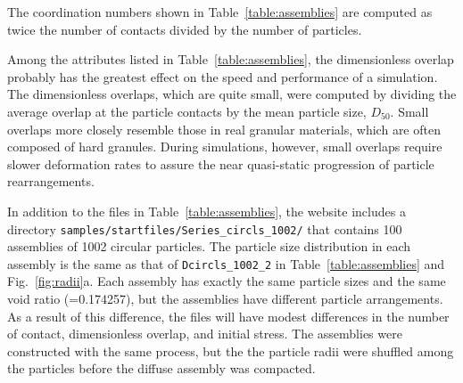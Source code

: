 \documentclass[letterpaper,11pt]{article}
\begin{document}
The coordination numbers shown in Table~\ref{table:assemblies}
are computed as
twice the number of contacts divided by the number of particles.
\par
Among the attributes listed in Table~\ref{table:assemblies},
the dimensionless overlap probably has the greatest effect on
the speed and performance of a simulation.
The dimensionless overlaps, which are quite small, were computed
by dividing the average overlap at the particle contacts by the
mean particle size, $D_{50}$.
Small overlaps more closely resemble those in real 
granular materials, which are often composed of hard granules.
During simulations, however, small overlaps
require slower deformation rates to assure the near quasi-static
progression of particle rearrangements.
\par
In addition to the files in Table~\ref{table:assemblies},
the website includes a directory 
\texttt{samples/startfiles/Series\_circls\_1002/}
that contains 100 assemblies of 1002 circular particles.
The particle size distribution in each assembly is the same as that of
\texttt{Dcircls\_1002\_2} in Table~\ref{table:assemblies}
and Fig.~\ref{fig:radii}a.
Each assembly has exactly the same particle sizes and the same void 
ratio (=0.174257), but the assemblies have different particle arrangements.
As a result of this difference, the files will have modest differences
in the number of contact, dimensionless overlap, and initial stress.
The assemblies were constructed with the same process, but the
the particle radii were shuffled among the particles before
the diffuse assembly was compacted.
%
%
\end{document}
